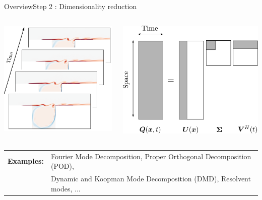 \documentclass[usenames,dvipsnames,svgnames,10pt,aspectratio=169]{beamer}
\begin{document}
\begin{frame}[t, c]{Overview}{Step 2 : Dimensionality reduction}
	\centering
	\begin{columns}
		\begin{column}{.33\textwidth}
			\centering
			\includegraphics[width=\columnwidth]{dimensionality_reduction}
		\end{column}
		\begin{column}{.4\textwidth}
			\centering
			\includegraphics[width=\columnwidth]{svd}
		\end{column}
	\end{columns}

	\bigskip

	\begin{tabular}{ll}
		\textbf{Examples:} & Fourier Mode Decomposition, Proper Orthogonal Decomposition (POD), \\
		~                  & Dynamic and Koopman Mode Decomposition (DMD), Resolvent modes, ...
	\end{tabular}
\end{frame}
\end{document}
